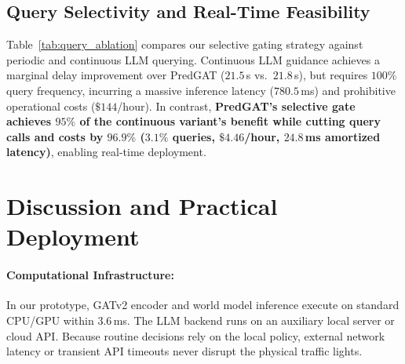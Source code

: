 \documentclass[11pt,a4paper]{article}
\begin{document}
\begin{table}[t]
\centering
\small
\caption{\textbf{Query Strategy Ablation.} Comparing Continuous vs.\ Selective LLM Guidance with Qwen-2.5-32B.}
\label{tab:query_ablation}
\end{table}

\subsection{Query Selectivity and Real-Time Feasibility}
Table~\ref{tab:query_ablation} compares our selective gating strategy against periodic and continuous LLM querying.
Continuous LLM guidance achieves a marginal delay improvement over PredGAT ($21.5$\,s vs.\ $21.8$\,s), but requires $100\%$ query frequency, incurring a massive inference latency ($780.5$\,ms) and prohibitive operational costs ($\$144$/hour). In contrast, \textbf{PredGAT's selective gate achieves $95\%$ of the continuous variant's benefit while cutting query calls and costs by $96.9\%$ ($3.1\%$ queries, $\$4.46$/hour, $24.8$\,ms amortized latency)}, enabling real-time deployment.

\section{Discussion and Practical Deployment}
\label{sec:discussion}
\paragraph{Computational Infrastructure:} In our prototype, GATv2 encoder and world model inference execute on standard CPU/GPU within $3.6$\,ms. The LLM backend runs on an auxiliary local server or cloud API. Because routine decisions rely on the local policy, external network latency or transient API timeouts never disrupt the physical traffic lights.
\end{document}
